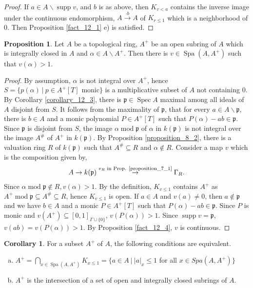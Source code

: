\documentclass[10pt]{article}
\numberwithin{equation}{section}
\theoremstyle{definition}
\newtheorem{proposition}{Proposition}[subsection]
\newtheorem{corollary}{Corollary} [subsection]
\DeclareMathOperator{\tmod}{mod}
\DeclareMathOperator{\supp}{supp}
\DeclareMathOperator{\Spec}{Spec}
\DeclareMathOperator{\Spa}{Spa}
\newcommand{\sep}[0]{\:|\:}
\newcommand{\p}[0]{\mathfrak{p}}
\newcommand{\ab}[1]{\vert #1 \vert}
\begin{document}
\begin{proof}
    If $a\in A\backslash\supp v$, and $b$ is as above, then $K_{v<a}$ contains the inverse image under the continuous endomorphism, $A\stackrel{\cdot b}{\to} A$ of $K_{r\leq 1}$ which is a neighborhood of $0$. Then Proposition \ref{fact_12_1} e) is satisfied.
\end{proof}
\begin{proposition}
    \label{proposition_12_2}
    Let $A$ be a topological ring, $A^+$ be an open subring of $A$ which is integrally closed in $A$ and $\alpha\in A\backslash A^+$. Then there is $v\in\Spa(A,A^+)$ such that $v(\alpha)>1$.
\end{proposition}
\begin{proof}
    By assumption, $\alpha$ is not integral over $A^+$, hence $S=\{p(\alpha)\sep p\in A^+[T]\text{ monic}\}$ is a multiplicative subset of $A$ not containing $0$. By Corollary \ref{corollary_12_3}, there is $\p\in\Spec A$ maximal among all ideals of $A$ disjoint from $S$. It follows from the maximality of $\p$, that for every $a\in A\backslash\p$, there is $b\in A$ and a monic polynomial $P\in A^+[T]$ such that $P(\alpha) -ab\in\p$. Since $\p$ is disjoint from $S$, the image $\alpha\tmod\p$ of $\alpha$ in $k(\p)$ is not integral over the image $A^\#$ of $A^+$ in $k(\p)$. By Proposition \ref{proposition_8_2}, there is a valuation ring $R$ of $k(\p)$ such that $A^\#\subseteq R$ and $\alpha\not\in R$. Consider a map $v$ which is the composition given by,
    \begin{equation*}
        A\to k(\p)\stackrel{\text{$v_R$ in Prop. \ref{proposition_7_1}}}{\to}\Gamma_R.
    \end{equation*}
    Since $\alpha\tmod\p\not\in R, v(\alpha)>1$. By the definition, $K_{v\leq1}$ contains $A^+$ as $A^+\tmod\p\subseteq A^\#\subseteq R$, hence $K_{v\leq1}$ is open. If $a\in A$ and $v(a)\not=0$, then $a\not\in \p$ and we have $b\in A$ and a monic $P\in A^+[T]$ such that $P(\alpha)-ab\in\p$. Since $P$ is monic and $v(A^+)\subseteq[0,1]_{\Gamma\cup\{0\}}$, $v(P(\alpha))>1$. Since $\supp v=\p$, $v(ab)=v(P(\alpha))>1$. By Proposition \ref{fact_12_4}, $v$ is continuous.
\end{proof}
\begin{corollary}
    \label{corollary_12_1}
    For a subset $A^+$ of $A$, the following conditions are equivalent.
    \begin{enumerate}[a.]
        \item $A^+ = \bigcap_{x\in\Spa(A,A^+)} K_{x\leq 1} = \{a\in A\sep \ab{a}_x\leq 1$ for all $x\in Spa(A,A^+)\}$
        \item $A^+$ is the intersection of a set of open and integrally closed subrings of $A$.
    \end{enumerate}
\end{corollary}
\end{document}
